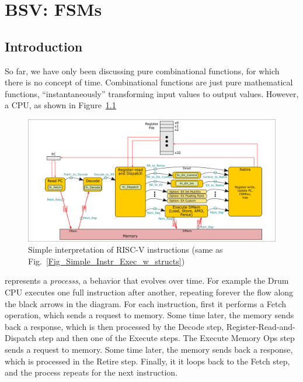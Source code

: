 

\chapter{BSV: FSMs}


\setcounter{page}{1}
\renewcommand{\thepage}{\arabic{chapter}-\arabic{page}}

\label{ch_FSMs}


\section{Introduction}


So far, we have only been discussing pure combinational functions, for
which there is no concept of time.  Combinational functions are just
pure mathematical functions, ``instantaneously'' transforming input
values to output values.  However, a CPU, as shown in
Figure~\ref{Fig_FSMs_Simple_Instr_Exec}
\begin{figure}[htbp]
  \centerline{\includegraphics[width=6in,angle=0]{Figures/Fig_Instr_Exec_w_structs}}
  \caption{\label{Fig_FSMs_Simple_Instr_Exec}
           Simple interpretation of RISC-V instructions
	   (same as Fig.~\ref{Fig_Simple_Instr_Exec_w_structs})}
\end{figure}
represents a \emph{processs}, a behavior that evolves over time.  For
example the Drum CPU executes one full instruction after another,
repeating forever the flow along the black arrows in the diagram. For
each instruction, first it performs a Fetch operation, which sends a
request to memory. Some time later, the memory sends back a response,
which is then processed by the Decode step, Register-Read-and-Dispatch
step and then one of the Execute steps.  The Execute Memory Ops step
sends a request to memory. Some time later, the memory sends back a
response, which is processed in the Retire step.  Finally, it it loops
back to the Fetch step, and the process repeats for the next
instruction.

